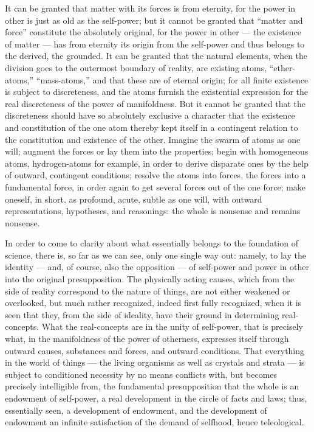 \documentclass[12pt]{book}
\begin{document}
It can be granted that matter with its forces is from eternity, for the power in other is
just as old as the self-power; but it cannot be granted that ``matter and force'' constitute
the absolutely original, for the power in other --- the existence of matter --- has from
eternity its origin from the self-power and thus belongs to the derived, the grounded. It can
be granted that the natural elements, when the division goes to the outermost boundary of
reality, are existing atoms, ``ether-atoms,'' ``mass-atoms,'' and that these are of eternal
origin; for all finite existence is subject to discreteness, and the atoms furnish the
existential expression for the real discreteness of the power of manifoldness. But it cannot
be granted that the discreteness should have so absolutely exclusive a character that the
existence and constitution of the one atom thereby kept itself in a contingent relation to
the constitution and existence of the other. Imagine the swarm of atoms as one will; augment
the forces or lay them into the properties; begin with homogeneous atoms, hydrogen-atoms for
example, in order to derive disparate ones by the help of outward, contingent conditions;
resolve the atoms into forces, the forces into a fundamental force, in order again to get
several forces out of the one force; make oneself, in short, as profound, acute, subtle as
one will, with outward representations, hypotheses, and reasonings: the whole is nonsense and
remains nonsense.

In order to come to clarity about what essentially belongs to the foundation of science,
there is, so far as we can see, only one single way out: namely, to lay the identity --- and,
of course, also the opposition --- of self-power and power in other into the original
presupposition. The physically acting causes, which from the side of reality correspond to
the nature of things, are not either weakened or overlooked, but much rather recognized,
indeed first fully recognized, when it is seen that they, from the side of ideality, have
their ground in determining real-concepts. What the real-concepts are in the unity of
self-power, that is precisely what, in the manifoldness of the power of otherness, expresses
itself through outward causes, substances and forces, and outward conditions. That everything
in the world of things --- the living organisms as well as crystals and strata --- is subject
to conditioned necessity by no means conflicts with, but becomes precisely intelligible from,
the fundamental presupposition that the whole is an endowment of self-power, a real
development in the circle of facts and laws; thus, essentially seen, a development of
endowment, and the development of endowment an infinite satisfaction of the demand of
selfhood, hence teleological.
\end{document}
